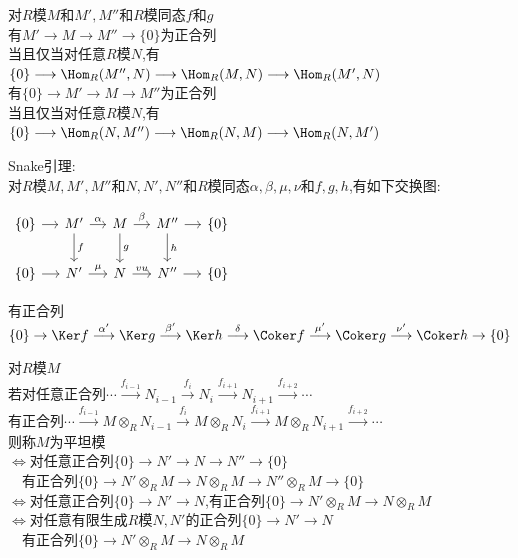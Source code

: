 \begin{dingli}
对$R$模$M$和$M',M''$和$R$模同态$f$和$g$\\
有$M' \longrightarrow M \longrightarrow M'' \longrightarrow \{0\}$为正合列\\
当且仅当对任意$R$模$N$,有$\{0\} \longrightarrow \Hom_{R}(M'',N) \longrightarrow \Hom_{R}(M,N) \longrightarrow \Hom_{R}(M',N)$\\
有$\{0\} \longrightarrow M' \longrightarrow M \longrightarrow M''$为正合列\\
当且仅当对任意$R$模$N$,有$\{0\} \longrightarrow \Hom_{R}(N,M'') \longrightarrow \Hom_{R}(N,M) \longrightarrow \Hom_{R}(N,M')$
\end{dingli}

\begin{dingli}
Snake引理:\\
对$R$模$M,M',M''$和$N,N',N''$和$R$模同态$\alpha,\beta,\mu,\nu$和$f,g,h$,有如下交换图:
\begin{center}
    $\begin{tikzcd}[column sep=small]
    \{0\} \ar[r] & M' \ar[r,"\alpha"] \ar[d,"f"] & M \ar[r,"\beta"] \ar[d,"g"] & M''\ar[r] \ar[d,"h"] & \{0\}\\
    \{0\} \ar[r] & N' \ar[r,"\mu"]    & N \ar[r,"vu"]    & N''\ar[r] & \{0\}
    \end{tikzcd}$
\end{center}
有正合列$\{0\}\rightarrow\Ker f\stackrel{\alpha'}{\longrightarrow}\Ker g\stackrel{\beta'}{\longrightarrow}\Ker h\stackrel{\delta}{\longrightarrow}\Coker f\stackrel{\mu'}{\longrightarrow}\Coker g\stackrel{\nu'}{\longrightarrow}\Coker h\rightarrow\{0\}$
\end{dingli}

\begin{dingyi}
对$R$模$M$\\
若对任意正合列$\cdots\stackrel{f_{i-1}}{\longrightarrow} N_{i-1}\stackrel{f_{i}}{\longrightarrow} N_i\stackrel{f_{i+1}}{\longrightarrow} N_{i+1}\stackrel{f_{i+2}}{\longrightarrow}\cdots$\\
有正合列$\cdots\stackrel{f_{i-1}}{\longrightarrow} M\otimes_{R}N_{i-1}\stackrel{f_{i}}{\longrightarrow} M\otimes_{R}N_i\stackrel{f_{i+1}}{\longrightarrow} M\otimes_{R}N_{i+1}\stackrel{f_{i+2}}{\longrightarrow}\cdots$\\
则称$M$为平坦模\\
$\Leftrightarrow$对任意正合列$\{0\}\to N'\to N\to N''\to \{0\}$\\{}$\quad$有正合列$\{0\}\to N'\otimes_{R}M\to N\otimes_{R}M\to N''\otimes_{R}M\to \{0\}$\\
$\Leftrightarrow$对任意正合列$\{0\}\to N'\to N$,有正合列$\{0\}\to N'\otimes_{R}M\to N\otimes_{R}M$\\
$\Leftrightarrow$对任意有限生成$R$模$N,N'$的正合列$\{0\}\to N'\to N$\\{}$\quad$有正合列$\{0\}\to N'\otimes_{R}M\to N\otimes_{R}M$
\end{dingyi}

